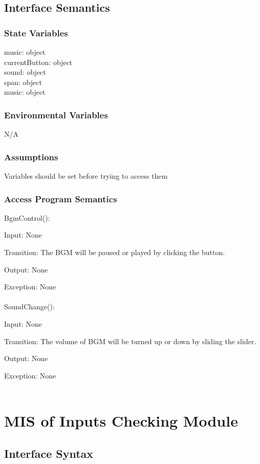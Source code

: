 \documentclass[12pt, titlepage]{article}
\begin{document}
		\subsection{Interface Semantics}
		\subsubsection{State Variables}
	    music: object \\
		currentButton: object \\
		sound: object \\
		span: object \\
		music: object
		\subsubsection{Environmental Variables}
		N/A
		\subsubsection{Assumptions}
		Variables should be set before trying to access them
		
		\subsubsection{Access Program Semantics}
		

		BgmControl():
		
		Input: None
		
		Transition: The BGM will be paused or played by clicking the button.
		
		Output: None
		
		Exception: None\\ 
		\\
		SoundChange():
		
		Input: None
		
		Transition: The volume of BGM will be turned up or down by sliding the slider.
		
		Output: None
		
		Exception: None\\ 
		\\
		
\section{MIS of Inputs Checking Module}
	\subsection{Interface Syntax}
\end{document}
